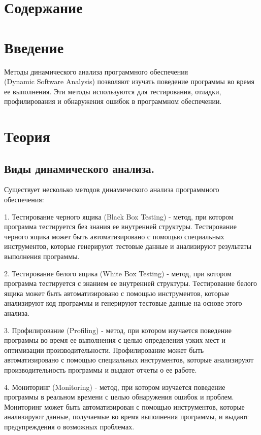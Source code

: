 \documentclass[utf8,14pt,a4paper,oneside,russian]{book}
\makeatletter
\renewcommand{\tableofcontents}{\section*{Содержание}\markboth{Содержание}{}\@starttoc{toc}\newpage}
\makeatother
\begin{document}
  \tableofcontents
  
  
  \section{Введение}
  Методы динамического анализа программного обеспечения \\
  (Dynamic Software Analysis) позволяют изучать поведение 
  программы во время ее выполнения. Эти методы используются 
  для тестирования, отладки, профилирования и обнаружения ошибок 
  в программном обеспечении.
  
  
  
  
  \newpage
  \section{Теория}
  
  \subsection{Виды динамического анализа.}
  
  Существует несколько методов динамического анализа программного обеспечения:

  1. Тестирование черного ящика (Black Box Testing) - метод, при котором программа тестируется без знания ее внутренней структуры. Тестирование черного ящика может быть автоматизировано с помощью специальных инструментов, которые генерируют тестовые данные и анализируют результаты выполнения программы.

2. Тестирование белого ящика (White Box Testing) - метод, при котором программа тестируется с знанием ее внутренней структуры. Тестирование белого ящика может быть автоматизировано с помощью инструментов, которые анализируют код программы и генерируют тестовые данные на основе этого анализа.

3. Профилирование (Profiling) - метод, при котором изучается поведение программы во время ее выполнения с целью определения узких мест и оптимизации производительности. Профилирование может быть автоматизировано с помощью специальных инструментов, которые анализируют производительность программы и выдают отчеты о ее работе.

4. Мониторинг (Monitoring) - метод, при котором изучается поведение программы в реальном времени с целью обнаружения ошибок и проблем. Мониторинг может быть автоматизирован с помощью инструментов, которые анализируют данные, получаемые во время выполнения программы, и выдают предупреждения о возможных проблемах.
\end{document}
